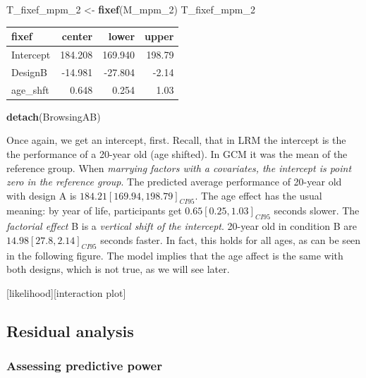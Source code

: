 \documentclass[]{svmono}
\newenvironment{Shaded}{\begin{snugshade}}{\end{snugshade}}
\newcommand{\KeywordTok}[1]{\textcolor[rgb]{0.13,0.29,0.53}{\textbf{#1}}}
\newcommand{\DecValTok}[1]{\textcolor[rgb]{0.00,0.00,0.81}{#1}}
\newcommand{\StringTok}[1]{\textcolor[rgb]{0.31,0.60,0.02}{#1}}
\newcommand{\NormalTok}[1]{#1}
\theoremstyle{definition}
\theoremstyle{definition}
\theoremstyle{definition}
\theoremstyle{remark}
\begin{document}
\begin{Shaded}
\begin{Highlighting}[]
\NormalTok{T_fixef_mpm_}\DecValTok{2}\NormalTok{ <-}\StringTok{  }\KeywordTok{fixef}\NormalTok{(M_mpm_}\DecValTok{2}\NormalTok{)}
\NormalTok{T_fixef_mpm_}\DecValTok{2}
\end{Highlighting}
\end{Shaded}

\begin{longtable}[]{@{}lrrr@{}}
\toprule
fixef & center & lower & upper\tabularnewline
\midrule
\endhead
Intercept & 184.208 & 169.940 & 198.79\tabularnewline
DesignB & -14.981 & -27.804 & -2.14\tabularnewline
age\_shft & 0.648 & 0.254 & 1.03\tabularnewline
\bottomrule
\end{longtable}

\begin{Shaded}
\begin{Highlighting}[]
\KeywordTok{detach}\NormalTok{(BrowsingAB)}
\end{Highlighting}
\end{Shaded}

Once again, we get an intercept, first. Recall, that in LRM the
intercept is the the performance of a 20-year old (age shifted). In GCM
it was the mean of the reference group. When \emph{marrying factors with
a covariates, the intercept is point zero in the reference group}. The
predicted average performance of 20-year old with design A is
\(184.21 [169.94, 198.79]_{CI95}\). The age effect has the usual
meaning: by year of life, participants get \(0.65 [0.25, 1.03]_{CI95}\)
seconds slower. The \emph{factorial effect} B is a \emph{vertical shift
of the intercept}. 20-year old in condition B are
\(14.98 [27.8, 2.14]_{CI95}\) seconds faster. In fact, this holds for
all ages, as can be seen in the following figure. The model implies that
the age affect is the same with both designs, which is not true, as we
will see later.

{[}likelihood{]}{[}interaction plot{]}

\subsection{Residual analysis}\label{residual-analysis}

\subsubsection{Assessing predictive power}\label{resid_predictive_power}
\end{document}
